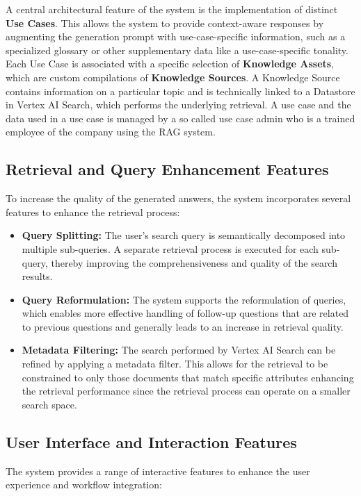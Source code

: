 \documentclass[
	english,
	ruledheaders=section,%
	class=report,%
	thesis={type=bachelor},%
	accentcolor=1b,%
	custommargins=true,%
	marginpar=false,%
	parskip=half-,%
	fontsize=11pt,%
	DIV=14,
]{tudapub}
\begin{document}
A central architectural feature of the system is the implementation of distinct \textbf{Use Cases}. This allows the system to provide context-aware responses by augmenting the generation prompt with use-case-specific information, such as a specialized glossary or other supplementary data like a use-case-specific tonality. Each Use Case is associated with a specific selection of \textbf{Knowledge Assets}, which are custom compilations of \textbf{Knowledge Sources}. A Knowledge Source contains information on a particular topic and is technically linked to a Datastore in Vertex AI Search, which performs the underlying retrieval. A use case and the data used in a use case is managed by a so called use case admin who is a trained employee of the company using the RAG system.

\subsection{Retrieval and Query Enhancement Features}
To increase the quality of the generated answers, the system incorporates several features to enhance the retrieval process:

\begin{itemize}
    \item \textbf{Query Splitting:} The user's search query is semantically decomposed into multiple sub-queries. A separate retrieval process is executed for each sub-query, thereby improving the comprehensiveness and quality of the search results.
    
    \item \textbf{Query Reformulation:} The system supports the reformulation of queries, which enables more effective handling of follow-up questions that are related to previous questions and generally leads to an increase in retrieval quality.
    
    \item \textbf{Metadata Filtering:} The search performed by Vertex AI Search can be refined by applying a metadata filter. This allows for the retrieval to be constrained to only those documents that match specific attributes enhancing the retrieval performance since the retrieval process can operate on a smaller search space.
\end{itemize}

\subsection{User Interface and Interaction Features}
The system provides a range of interactive features to enhance the user experience and workflow integration:
\end{document}
